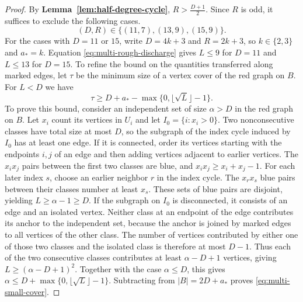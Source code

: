 \documentclass[preprint,11pt,numbers]{elsarticle-arxiv}
\numberwithin{equation}{section}
\theoremstyle{definition}
\begin{document}
\begin{proof}
By \textbf{Lemma~\ref{lem:half-degree-cycle}}, $R>\frac{D+1}{2}$.
Since $R$ is odd, it suffices to exclude the following cases.
\[
 (D,R)\in\{(11,7),(13,9),(15,9)\}.
\]
For the cases with $D=11$ or $15$, write $D=4k+3$ and $R=2k+3$,
so $k\in\{2,3\}$ and $a_*=k$. Equation
\eqref{eq:multi-rough-discharge} gives $L\leq9$ for $D=11$
and $L\leq13$ for $D=15$. To refine the bound on the quantities
transferred along marked edges, let $\tau$ be the minimum size
of a vertex cover of the red graph on $B$. For $L<D$ we have
\begin{equation}\label{eq:multi-small-cover}
 \tau\ge D+a_*-\max\{0,\lfloor\sqrt L\rfloor-1\}.
\end{equation}
To prove this bound, consider an independent set of size $\alpha>D$
in the red graph on $B$. Let $x_i$ count its vertices in $U_i$ and
let $I_0=\{i:x_i>0\}$. Two nonconsecutive classes have total size
at most $D$, so the subgraph of the index cycle induced by $I_0$
has at least one edge. If it is connected, order its vertices
starting with the endpoints $i,j$ of an edge and then adding
vertices adjacent to earlier vertices. The $x_i x_j$ pairs
between the first two classes are blue, and
$x_i x_j\ge x_i+x_j-1$. For each later index $s$, choose an
earlier neighbor $r$ in the index cycle. The $x_r x_s$ blue
pairs between their classes number at least $x_s$. These sets of
blue pairs are disjoint, yielding $L\ge\alpha-1\ge D$.
If the subgraph on $I_0$ is disconnected, it consists of an edge
and an isolated vertex. Neither class at an endpoint of the edge
contributes its anchor to the independent set, because the anchor
is joined by marked edges to all vertices of the other class.
The number of vertices contributed by either one of those two
classes and the isolated class is therefore at most $D-1$.
Thus each of the two consecutive classes contributes at least
$\alpha-D+1$ vertices, giving $L\ge(\alpha-D+1)^2$.
Together with the case $\alpha\le D$, this gives
$\alpha\le D+\max\{0,\lfloor\sqrt L\rfloor-1\}$.
Subtracting from $|B|=2D+a_*$ proves \eqref{eq:multi-small-cover}.


\end{proof}
\end{document}
